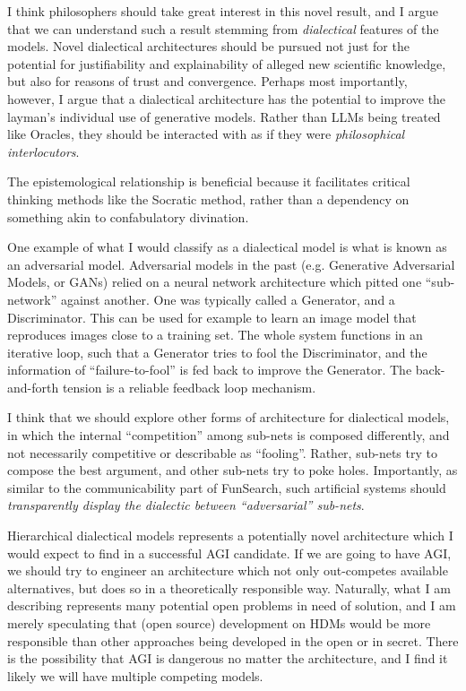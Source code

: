\documentclass[11pt, oneside]{article}   	%
\begin{document}
I think philosophers should take great interest in this novel result, and I argue that we can understand such a result stemming from \emph{dialectical} features of the models.  Novel dialectical architectures should be pursued not just for the potential for justifiability and explainability of alleged new scientific knowledge, but also for reasons of trust and convergence.  Perhaps most importantly, however, I argue that a dialectical architecture has the potential to improve the layman's individual use of generative models.  Rather than LLMs being treated like Oracles, they should be interacted with as if they were \emph{philosophical interlocutors}.  

The epistemological relationship is beneficial because it facilitates critical thinking methods like the Socratic method, rather than a dependency on something akin to confabulatory divination.  

One example of what I would classify as a dialectical model is what is known as an adversarial model. Adversarial models in the past (e.g. Generative Adversarial Models, or GANs) relied on a neural network architecture which pitted one ``sub-network'' against another.  One was typically called a Generator, and a Discriminator.  This can be used for example to learn an image model that reproduces images close to a training set.  The whole system functions in an iterative loop, such that a Generator tries to fool the Discriminator, and the information of ``failure-to-fool'' is fed back to improve the Generator.  The back-and-forth tension is a reliable feedback loop mechanism.

I think that we should explore other forms of architecture for dialectical models, in which the internal ``competition'' among sub-nets is composed differently, and not necessarily competitive or describable as ``fooling''.  Rather, sub-nets try to compose the best argument, and other sub-nets try to poke holes.  Importantly, as similar to the communicability part of FunSearch, such artificial systems should \emph{transparently display the dialectic between ``adversarial'' sub-nets}.  

Hierarchical dialectical models represents a potentially novel architecture which I would expect to find in a successful AGI candidate.  If we are going to have AGI, we should try to engineer an architecture which not only out-competes available alternatives, but does so in a theoretically responsible way.  Naturally, what I am describing represents many potential open problems in need of solution, and I am merely speculating that (open source) development on HDMs would be more responsible than other approaches being developed in the open or in secret.  There is the possibility that AGI is dangerous no matter the architecture, and I find it likely we will have multiple competing models.
\end{document}
